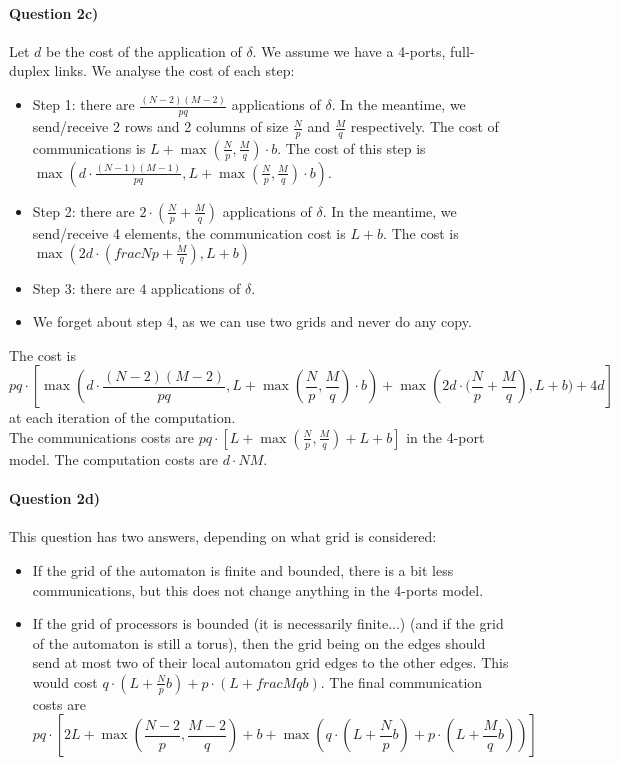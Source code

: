 \documentclass[a4paper,12pt]{article}
\begin{document}
\paragraph{Question 2c)}
Let $d$ be the cost of the application of $\delta$. We assume we have a 4-ports, full-duplex links. We analyse the cost of each step:
\begin{itemize}
\item Step 1: there are $\frac{(N-2)(M-2)}{pq}$ applications of $\delta$. In the meantime, we send/receive 2 rows and 2 columns of size $\frac{N}{p}$ and $\frac{M}{q}$ respectively. The cost of communications is $L + \max(\frac{N}{p}, \frac{M}{q}) \cdot b$. The cost of this step is $\max(d \cdot \frac{(N-1)(M-1)}{pq}, L + \max(\frac{N}{p}, \frac{M}{q}) \cdot b)$.
\item Step 2: there are $2 \cdot (\frac{N}{p} + \frac{M}{q})$ applications of $\delta$. In the meantime, we send/receive 4 elements, the communication cost is $L + b$. The cost is $\max(2d \cdot (frac{N}{p} + \frac{M}{q}), L + b)$
\item Step 3: there are $4$ applications of $\delta$.
\item We forget about step 4, as we can use two grids and never do any copy.
\end{itemize}
The cost is $$pq \cdot \left [ \max \left ( d \cdot \frac{(N-2)(M-2)}{pq}, L + \max(\frac{N}{p}, \frac{M}{q}) \cdot b \right )  + \max \left ( 2d \cdot (\frac{N}{p} + \frac{M}{q} \right ), L + b) + 4d \right ]$$ at each iteration of the computation.\\
The communications costs are $pq \cdot \left [ L + \max(\frac{N}{p}, \frac{M}{q}) + L + b \right ]$ in the 4-port model. The computation costs are $d \cdot NM$.

\paragraph{Question 2d)} This question has two answers, depending on what grid is considered:
\begin{itemize}
\item If the grid of the automaton is finite and bounded, there is a bit less communications, but this does not change anything in the 4-ports model.
\item If the grid of processors is bounded (it is necessarily finite...) (and if the grid of the automaton is still a torus), then the grid being on the edges should send at most two of their local automaton grid edges to the other edges. This would cost $q\cdot(L + \frac{N}{p}b) + p\cdot(L+frac{M}{q}b)$. The final communication costs are $$pq \cdot \left [ 2L + \max(\frac{N-2}{p}, \frac{M-2}{q}) + b + \max \left ( q\cdot(L + \frac{N}{p}b) + p\cdot(L+\frac{M}{q}b) \right ) \right ]$$
\end{itemize}
\end{document}
